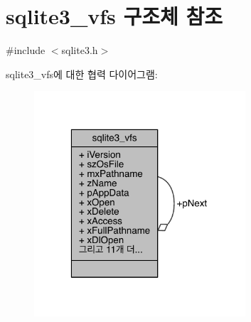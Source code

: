\hypertarget{structsqlite3__vfs}{}\section{sqlite3\+\_\+vfs 구조체 참조}
\label{structsqlite3__vfs}


{\ttfamily \#include $<$sqlite3.\+h$>$}



sqlite3\+\_\+vfs에 대한 협력 다이어그램\+:
\nopagebreak
\begin{figure}[H]
\begin{center}
\leavevmode
\includegraphics[width=223pt]{d9/dff/structsqlite3__vfs__coll__graph}
\end{center}
\end{figure}
